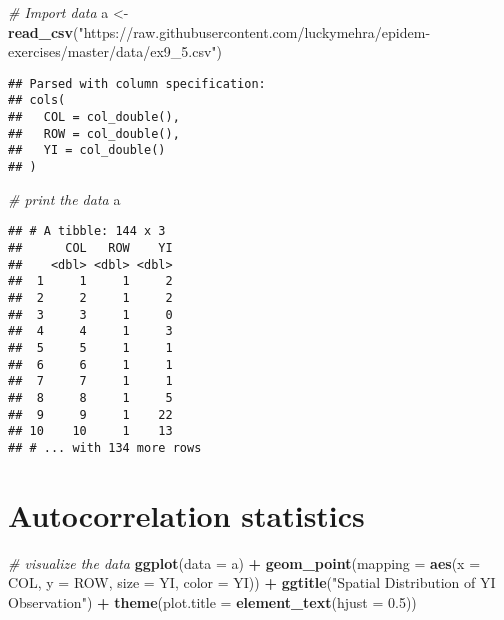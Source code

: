 \documentclass[]{book}
\newenvironment{Shaded}{\begin{snugshade}}{\end{snugshade}}
\newcommand{\CommentTok}[1]{\textcolor[rgb]{0.56,0.35,0.01}{\textit{#1}}}
\newcommand{\DataTypeTok}[1]{\textcolor[rgb]{0.13,0.29,0.53}{#1}}
\newcommand{\FloatTok}[1]{\textcolor[rgb]{0.00,0.00,0.81}{#1}}
\newcommand{\KeywordTok}[1]{\textcolor[rgb]{0.13,0.29,0.53}{\textbf{#1}}}
\newcommand{\NormalTok}[1]{#1}
\newcommand{\OperatorTok}[1]{\textcolor[rgb]{0.81,0.36,0.00}{\textbf{#1}}}
\newcommand{\StringTok}[1]{\textcolor[rgb]{0.31,0.60,0.02}{#1}}
\begin{document}
\begin{Shaded}
\begin{Highlighting}[]
\CommentTok{# Import data}
\NormalTok{a <-}\StringTok{ }\KeywordTok{read_csv}\NormalTok{(}\StringTok{"https://raw.githubusercontent.com/luckymehra/epidem-exercises/master/data/ex9_5.csv"}\NormalTok{)}
\end{Highlighting}
\end{Shaded}

\begin{verbatim}
## Parsed with column specification:
## cols(
##   COL = col_double(),
##   ROW = col_double(),
##   YI = col_double()
## )
\end{verbatim}

\begin{Shaded}
\begin{Highlighting}[]
\CommentTok{# print the data}
\NormalTok{a}
\end{Highlighting}
\end{Shaded}

\begin{verbatim}
## # A tibble: 144 x 3
##      COL   ROW    YI
##    <dbl> <dbl> <dbl>
##  1     1     1     2
##  2     2     1     2
##  3     3     1     0
##  4     4     1     3
##  5     5     1     1
##  6     6     1     1
##  7     7     1     1
##  8     8     1     5
##  9     9     1    22
## 10    10     1    13
## # ... with 134 more rows
\end{verbatim}

\hypertarget{autocorrelation-statistics-1}{%
\section{Autocorrelation statistics}\label{autocorrelation-statistics-1}}

\begin{Shaded}
\begin{Highlighting}[]
\CommentTok{# visualize the data}
\KeywordTok{ggplot}\NormalTok{(}\DataTypeTok{data =}\NormalTok{ a) }\OperatorTok{+}
\StringTok{  }\KeywordTok{geom_point}\NormalTok{(}\DataTypeTok{mapping =} \KeywordTok{aes}\NormalTok{(}\DataTypeTok{x =}\NormalTok{ COL, }\DataTypeTok{y =}\NormalTok{ ROW, }\DataTypeTok{size =}\NormalTok{ YI, }\DataTypeTok{color =}\NormalTok{ YI)) }\OperatorTok{+}
\StringTok{  }\KeywordTok{ggtitle}\NormalTok{(}\StringTok{"Spatial Distribution of YI Observation"}\NormalTok{) }\OperatorTok{+}
\StringTok{  }\KeywordTok{theme}\NormalTok{(}\DataTypeTok{plot.title =} \KeywordTok{element_text}\NormalTok{(}\DataTypeTok{hjust =} \FloatTok{0.5}\NormalTok{))}
\end{Highlighting}
\end{Shaded}
\end{document}
